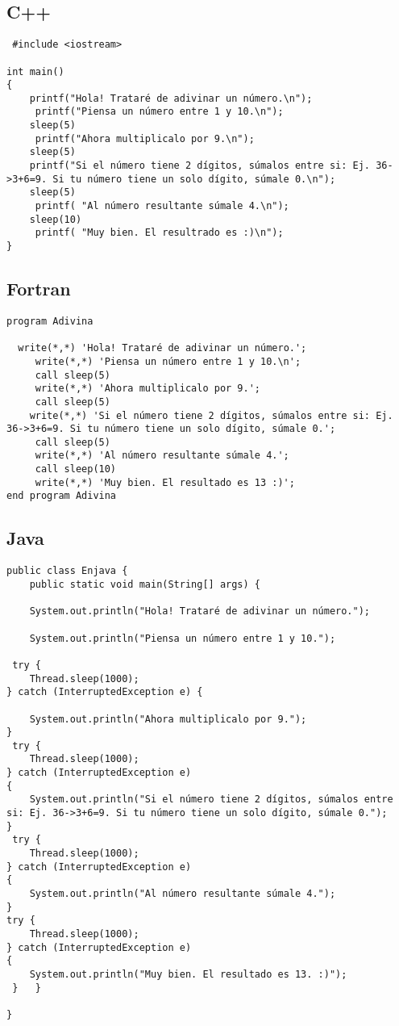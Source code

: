 \documentclass[11pt]{article}
\begin{document}
\subsection{C++}
\begin{verbatim}
 #include <iostream>
 
int main()
{
    printf("Hola! Trataré de adivinar un número.\n");
     printf("Piensa un número entre 1 y 10.\n");
    sleep(5)	
     printf("Ahora multiplicalo por 9.\n");
    sleep(5)
    printf("Si el número tiene 2 dígitos, súmalos entre si: Ej. 36->3+6=9. Si tu número tiene un solo dígito, súmale 0.\n");
    sleep(5)
     printf( "Al número resultante súmale 4.\n");
    sleep(10)	
     printf( "Muy bien. El resultrado es :)\n"); 
} 
\end{verbatim}
\subsection{Fortran}
\begin{verbatim}
program Adivina 

  write(*,*) 'Hola! Trataré de adivinar un número.';
     write(*,*) 'Piensa un número entre 1 y 10.\n';
     call sleep(5)	
     write(*,*) 'Ahora multiplicalo por 9.';
     call sleep(5)
    write(*,*) 'Si el número tiene 2 dígitos, súmalos entre si: Ej. 36->3+6=9. Si tu número tiene un solo dígito, súmale 0.';
     call sleep(5)
     write(*,*) 'Al número resultante súmale 4.';
     call sleep(10)	
     write(*,*) 'Muy bien. El resultado es 13 :)'; 
end program Adivina
\end{verbatim}
\subsection{Java}
\begin{verbatim}
public class Enjava {
    public static void main(String[] args) {
    
    System.out.println("Hola! Trataré de adivinar un número.");

    System.out.println("Piensa un número entre 1 y 10.");

 try {
    Thread.sleep(1000);
} catch (InterruptedException e) {

    System.out.println("Ahora multiplicalo por 9.");
}
 try {
    Thread.sleep(1000);
} catch (InterruptedException e)
{
    System.out.println("Si el número tiene 2 dígitos, súmalos entre si: Ej. 36->3+6=9. Si tu número tiene un solo dígito, súmale 0.");
}
 try {
    Thread.sleep(1000);
} catch (InterruptedException e)
{
    System.out.println("Al número resultante súmale 4.");
}
try {
    Thread.sleep(1000);
} catch (InterruptedException e)
{
    System.out.println("Muy bien. El resultado es 13. :)"); 
 }   }

}
\end{verbatim}
\end{document}
